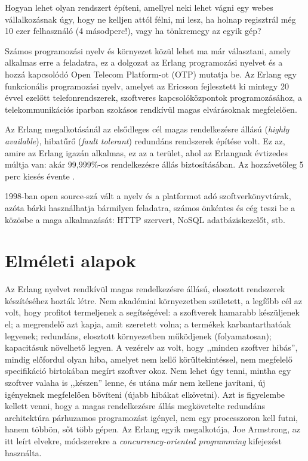 \documentclass[12pt, a4paper, oneside]{book}
\begin{document}
Hogyan lehet olyan rendszert építeni, amellyel neki lehet vágni egy webes
vállalkozásnak úgy, hogy ne kelljen attól félni, mi lesz, ha holnap regisztrál
még 10 ezer felhasználó (4 másodperc!), vagy ha tönkremegy az egyik gép?

Számos programozási nyelv és környezet közül lehet ma már választani, amely
alkalmas erre a feladatra, ez a dolgozat az Erlang programozási nyelvet és a
hozzá kapcsolódó Open Telecom Platform-ot (OTP) mutatja be. Az Erlang egy
funkcionális programozási nyelv, amelyet az Ericsson fejlesztett ki mintegy 20
évvel ezelőtt telefonrendszerek, szoftveres kapcsolóközpontok programozásához,
a telekommunikációs iparban szokásos rendkívül magas elvárásoknak megfelelően. 

Az Erlang megalkotásánál az elsődleges cél magas rendelkezésre állású
(\emph{highly available}), hibatűrő (\emph{fault tolerant}) redundáns
rendszerek építése volt. Ez az, amire az Erlang igazán alkalmas, ez az a
terület, ahol az Erlangnak évtizedes múltja van: akár 99,999\%-os
rendelkezésre állás biztosításában. Az hozzávetőleg 5 perc kiesés
évente \citep{WikipediaNines}.

1998-ban open source-szá vált a nyelv és a platformot adó
szoftverkönyvtárak, azóta bárki használhatja bármilyen feladatra, számos
önkéntes és cég teszi be a közösbe a maga alkalmazását: HTTP szervert, NoSQL
adatbáziskezelőt, stb.

\newpage

\chapter{Elméleti alapok} 

Az Erlang nyelvet rendkívül magas rendelkezésre állású, elosztott rendszerek
készítéséhez hozták létre. Nem akadémiai környezetben született, a legfőbb cél
az volt, hogy profitot termeljenek a segítségével: a szoftverek hamarabb
készüljenek el; a megrendelő azt kapja, amit szeretett volna; a termékek
karbantarthatóak legyenek; redundáns, elosztott környezetben működjenek
(folyamatosan); kapacitásuk növelhető legyen. A vezérelv az volt, hogy ,,minden
szoftver hibás'', mindig előfordul olyan hiba, amelyet nem kellő
körültekintéssel, nem megfelelő specifikáció birtokában megírt szoftver okoz.
Nem lehet úgy tenni, mintha egy szoftver valaha is ,,készen'' lenne, és utána már
nem kellene javítani, új igényeknek megfelelően bővíteni (újabb hibákat
elkövetni). Azt is figyelembe kellett venni, hogy a magas
rendelkezésre állás megkövetelte redundáns architektúra párhuzamos programozást
igényel, nem egy processzoron kell futni, hanem többön, sőt több gépen. Az
Erlang egyik megalkotója, Joe Armstrong, az itt leírt elvekre, módszerekre a
\emph{concurrency-oriented programming} kifejezést használta.
\end{document}

